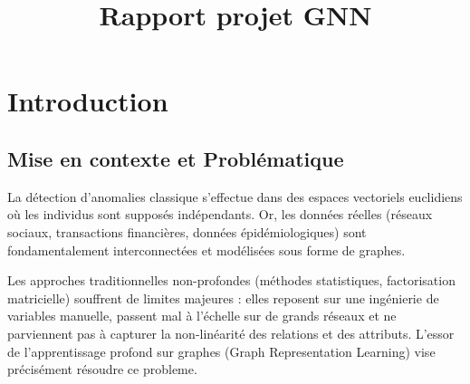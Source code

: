 \documentclass[french]{cls/llncs}
\title{Rapport projet GNN}
\institute{Université Claude Bernard Lyon 1, France}
\begin{document}
    \maketitle

    \section{Introduction} \label{intro}
    \subsection{Mise en contexte et Problématique}
    La détection d'anomalies classique s'effectue 
    dans des espaces vectoriels euclidiens où les 
    individus sont supposés indépendants. Or, 
    les données réelles (réseaux sociaux, transactions 
    financières, données épidémiologiques) sont 
    fondamentalement interconnectées et modélisées 
    sous forme de graphes.

    Les approches traditionnelles non-profondes 
    (méthodes statistiques, factorisation matricielle) 
    souffrent de limites majeures : elles 
    reposent sur une ingénierie de variables 
    manuelle, passent mal à l'échelle sur de 
    grands réseaux et ne parviennent pas à 
    capturer la non-linéarité des relations et 
    des attributs. L'essor de l'apprentissage 
    profond sur graphes (Graph Representation 
    Learning) vise précisément résoudre ce 
    probleme.
\end{document}
